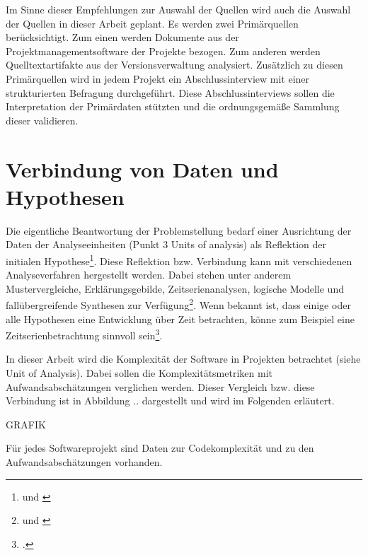 Im Sinne dieser Empfehlungen zur Auswahl der Quellen wird auch die
Auswahl der Quellen in dieser Arbeit geplant. Es werden zwei
Primärquellen berücksichtigt. Zum einen werden Dokumente aus der
Projektmanagementsoftware der Projekte bezogen. Zum anderen werden
Quelltextartifakte aus der Versionsverwaltung analysiert. Zusätzlich zu
diesen Primärquellen wird in jedem Projekt ein Abschlussinterview mit
einer strukturierten Befragung durchgeführt. Diese Abschlussinterviews
sollen die Interpretation der Primärdaten stützten und die
ordnungsgemä\ss e Sammlung dieser validieren.

\section{Verbindung von Daten und Hypothesen}\label{verbindung-von-daten-und-hypothesen}

Die eigentliche Beantwortung der Problemstellung bedarf einer
Ausrichtung der Daten der Analyseeinheiten (Punkt 3 Units of analysis)
als Reflektion der initialen Hypothese\footnote{\cite[Vgl. ][S. 78]{yinCaseStudyResearch2014} und \cite[][S. 11]{gothlichFallstudienAlsForschungsmethode2003}}. Diese Reflektion
bzw. Verbindung kann mit verschiedenen Analyseverfahren hergestellt
werden. Dabei stehen unter anderem Mustervergleiche, Erklärungsgebilde,
Zeitserienanalysen, logische Modelle und fallübergreifende Synthesen zur
Verfügung\footnote{\cite[Vgl. ][S. 78]{yinCaseStudyResearch2014} und \cite[][S. 11]{gothlichFallstudienAlsForschungsmethode2003}}. Wenn bekannt ist,
dass einige oder alle Hypothesen eine Entwicklung über Zeit betrachten,
könne zum Beispiel eine Zeitserienbetrachtung sinnvoll sein\footcite[Vgl. ][S. 78 und 225]{yinCaseStudyResearch2014}.

In dieser Arbeit wird die Komplexität der Software in Projekten
betrachtet (siehe Unit of Analysis). Dabei sollen die
Komplexitätsmetriken mit Aufwandsabschätzungen verglichen werden. Dieser
Vergleich bzw. diese Verbindung ist in Abbildung .. dargestellt und wird
im Folgenden erläutert.

GRAFIK

Für jedes Softwareprojekt sind Daten zur Codekomplexität und zu den
Aufwandsabschätzungen vorhanden.

